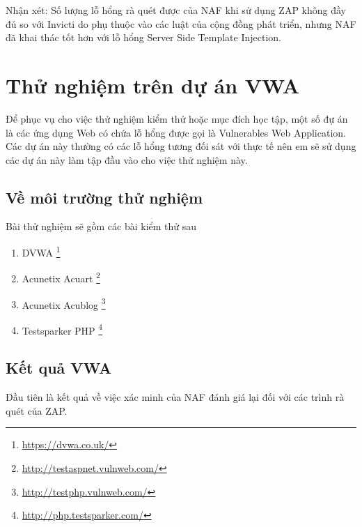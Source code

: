 \documentclass[./../main.tex]{subfiles}
\begin{document}
Nhận xét: Số lượng lỗ hổng rà quét được của NAF khi sử dụng ZAP không đầy đủ so với Invicti do phụ thuộc vào các luật của cộng đồng phát triển, nhưng NAF đã khai thác tốt hơn với lỗ hổng Server Side Template Injection.


\section{Thử nghiệm trên dự án VWA}

Để phục vụ cho việc thử nghiệm kiểm thử hoặc mục đích học tập, một số đự án là các ứng dụng Web có chứa lỗ hổng được gọi là Vulnerables Web Application. Các dự án này thường có các lỗ hổng tương đối sát với thực tế nên em sẽ sử dụng các dự án này làm tập đầu vào cho việc thử nghiệm này.

\subsection{Về môi trường thử nghiệm}

Bài thử nghiệm sẽ gồm các bài kiểm thử sau
\begin{enumerate}
	\item DVWA \footnote{\url{https://dvwa.co.uk/}}
	\item Acunetix Acuart \footnote{\url{http://testaspnet.vulnweb.com/}}
	\item Acunetix Acublog \footnote{\url{http://testphp.vulnweb.com/}}
	\item Testsparker PHP \footnote{\url{http://php.testsparker.com/}}
\end{enumerate}

\subsection{Kết quả VWA}

Đầu tiên là kết quả về việc xác minh của NAF đánh giá lại đối với các trình rà quét của ZAP.
\end{document}
